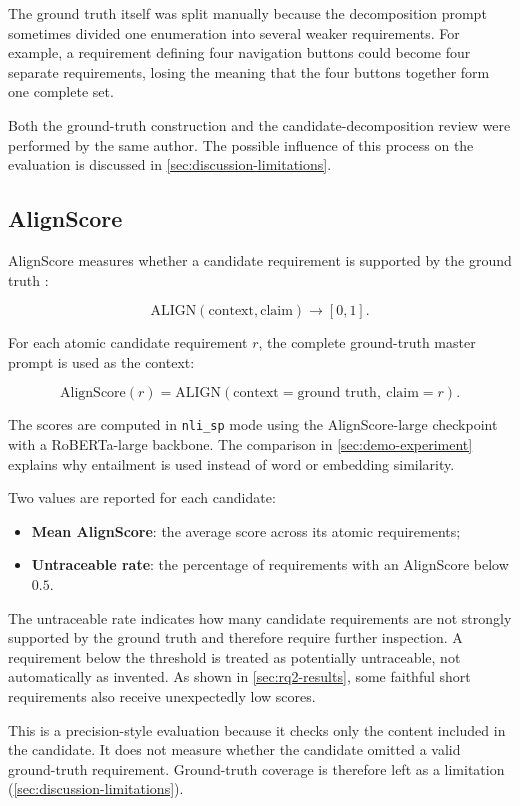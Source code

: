 The ground truth itself was split manually because the decomposition prompt
sometimes divided one enumeration into several weaker requirements. For
example, a requirement defining four navigation buttons could become four
separate requirements, losing the meaning that the four buttons together form
one complete set.

Both the ground-truth construction and the candidate-decomposition review were
performed by the same author. The possible influence of this process on the
evaluation is discussed in \cref{sec:discussion-limitations}.


\subsection{AlignScore}

AlignScore measures whether a candidate requirement is supported by the
ground truth \citep{zha2023alignscore}:

\[
\mathrm{ALIGN}(\text{context}, \text{claim}) \rightarrow [0,1].
\]

For each atomic candidate requirement $r$, the complete ground-truth master
prompt is used as the context:

\[
\mathrm{AlignScore}(r) = \mathrm{ALIGN}(\text{context}=\text{ground truth},\ \text{claim}=r).
\]

The scores are computed in \texttt{nli\_sp} mode using the AlignScore-large
checkpoint with a RoBERTa-large backbone. The comparison in
\cref{sec:demo-experiment} explains why entailment is used instead of word or
embedding similarity.

Two values are reported for each candidate:

\begin{itemize}[leftmargin=*]
  \item \textbf{Mean AlignScore}: the average score across its atomic
  requirements;
  \item \textbf{Untraceable rate}: the percentage of requirements with an
  AlignScore below $0.5$.
\end{itemize}

The untraceable rate indicates how many candidate requirements are not strongly
supported by the ground truth and therefore require further inspection. A
requirement below the threshold is treated as potentially untraceable, not
automatically as invented. As shown in \cref{sec:rq2-results}, some faithful
short requirements also receive unexpectedly low scores.

This is a precision-style evaluation because it checks only the content
included in the candidate. It does not measure whether the candidate omitted
a valid ground-truth requirement. Ground-truth coverage is therefore left as
a limitation (\cref{sec:discussion-limitations}).


